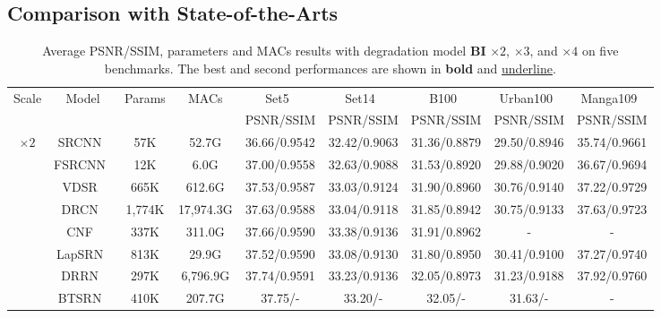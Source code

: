 \documentclass[manuscript,screen]{acmart}
\begin{document}
\subsection{Comparison with State-of-the-Arts}
\begin{table*}[t]
	\centering
	\caption{Average PSNR/SSIM, parameters and MACs results with degradation model \textbf{BI} $\times2$, $\times3$, and $\times4$ on five benchmarks. The best and second performances are shown in \textbf{bold} and \underline{underline}.}
	\label{tab:BI-result}
	\fontsize{7.5}{8}\selectfont
	\begin{tabular}{|c|c|c|c|c|c|c|c|c|}
		\hline
		\multirow{2}{*}{Scale}& \multirow{2}{*}{Model}&  \multirow{2}{*}{Params}& \multirow{2}{*}{MACs}& Set5~\cite{set5}& Set14~\cite{set14}& B100~\cite{b100}& Urban100~\cite{urban100}& Manga109~\cite{manga109} \\
		& & & & PSNR/SSIM & PSNR/SSIM & PSNR/SSIM & PSNR/SSIM & PSNR/SSIM\\
\hline
		\hline
		\multirow{17}{*}{$\times2$} &SRCNN~\cite{srcnn_pami2016}&57K &52.7G & 
		36.66/0.9542& 32.42/0.9063& 31.36/0.8879& 29.50/0.8946& 35.74/0.9661\\
		
		& FSRCNN~\cite{fsrcnn_eccv2016}&12K&6.0G& 
		37.00/0.9558& 32.63/0.9088& 31.53/0.8920& 29.88/0.9020& 36.67/0.9694\\
		
		& VDSR~\cite{vdsr_cvpr2016}&665K&612.6G& 
		37.53/0.9587& 33.03/0.9124& 31.90/0.8960& 30.76/0.9140& 37.22/0.9729\\
		
		& DRCN~\cite{drcn_cvpr2016}&1,774K&17,974.3G& 
		37.63/0.9588& 33.04/0.9118& 31.85/0.8942& 30.75/0.9133& 37.63/0.9723\\
		
		& CNF~\cite{cnf_cvprw2017}&337K&311.0G& 
		37.66/0.9590& 33.38/0.9136& 31.91/0.8962& - & - \\
		
		&LapSRN~\cite{lapsrn_cvpr2017}&813K&29.9G& 
		37.52/0.9590& 33.08/0.9130& 31.80/0.8950& 30.41/0.9100& 37.27/0.9740\\
		
		&DRRN~\cite{drrn_cvpr2017}&297K&6,796.9G& 
		37.74/0.9591& 33.23/0.9136& 32.05/0.8973& 31.23/0.9188& 37.92/0.9760\\
		
		&BTSRN~\cite{btsrn_cvprw2017}&410K&207.7G& 
		37.75/-& 33.20/-& 32.05/-& 31.63/-& -\\
		

\end{tabular}
\end{table*}
\end{document}

